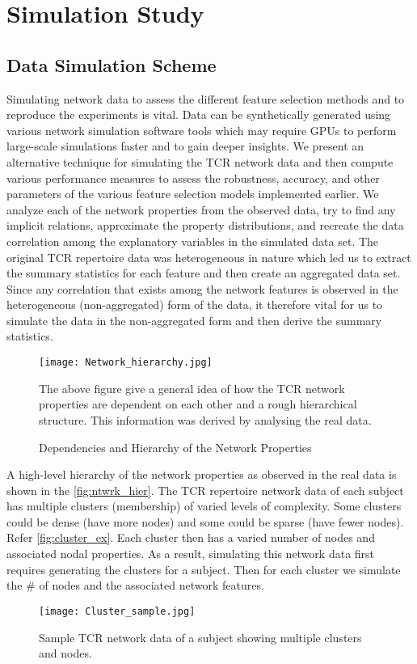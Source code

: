 \chapter{Simulation Study}
\section{Data Simulation Scheme}\label{sec:sim_scheme}
Simulating network data to assess the different feature selection methods and to reproduce the experiments is vital. Data can be synthetically generated using various network simulation software tools which may require GPUs to perform large-scale simulations faster and to gain deeper insights. We present an alternative technique for simulating the TCR network data and then compute various performance measures to assess the robustness, accuracy, and other parameters of the various feature selection models implemented earlier. We analyze each of the network properties from the observed data, try to find any implicit relations, approximate the property distributions, and recreate the data correlation among the explanatory variables in the simulated data set. The original TCR repertoire data was heterogeneous in nature which led us to extract the summary statistics for each feature and then create an aggregated data set. Since any correlation that exists among the network features is observed in the heterogeneous (non-aggregated) form of the data, it therefore vital for us to simulate the data in the non-aggregated form and then derive the summary statistics.\par
\begin{figure}[H]
\centering
\texttt{[image: Network\_hierarchy.jpg]}
\caption{Dependencies and Hierarchy of the Network Properties}%
{The above figure give a general idea of how the TCR network properties are dependent on each other and a rough hierarchical structure. This information was derived by analysing the real data.}
\label{fig:ntwrk_hier}
\end{figure}
A high-level hierarchy of the network properties as observed in the real data is shown in the \autoref{fig:ntwrk_hier}. The TCR repertoire network data of each subject has multiple clusters (membership) of varied levels of complexity. Some clusters could be dense (have more nodes) and some could be sparse (have fewer nodes). Refer \autoref{fig:cluster_ex}. Each cluster then has a varied number of nodes and associated nodal properties. As a result, simulating this network data first requires generating the clusters for a subject. Then for each cluster we simulate the \# of nodes and the associated network features.\par
\begin{figure}[H]
\centering
\texttt{[image: Cluster\_sample.jpg]}
\caption{Sample TCR network data of a subject showing multiple clusters and nodes.}
\label{fig:cluster_ex}
\end{figure}

